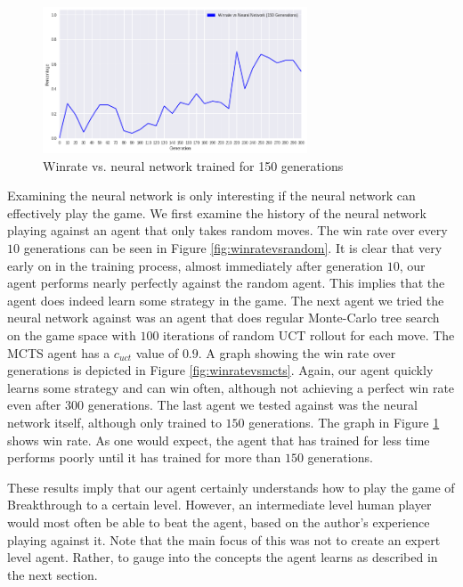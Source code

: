 \begin{figure}
    \begin{small}
        \begin{center}
            \includegraphics[width=0.7\textwidth]{graphics/winratevsneuralnetwork.png}
        \end{center}
        \caption{Winrate vs. neural network trained for 150 generations}
        \label{fig:winratevsneuralnetwork}
    \end{small}
\end{figure}

Examining the neural network is only interesting if the neural network can effectively play the game. We first examine the history of the neural network playing against an agent that only takes random moves. The win rate over every $10$ generations can be seen in Figure \ref{fig:winratevsrandom}. It is clear that very early on in the training process, almost immediately after generation $10$, our agent performs nearly perfectly against the random agent. This implies that the agent does indeed learn some strategy in the game. The next agent we tried the neural network against was an agent that does regular Monte-Carlo tree search on the game space with $100$ iterations of random UCT rollout for each move. The MCTS agent has a $c_{uct}$ value of $0.9$. A graph showing the win rate over generations is depicted in Figure \ref{fig:winratevsmcts}. Again, our agent quickly learns some strategy and can win often, although not achieving a perfect win rate even after $300$ generations. The last agent we tested against was the neural network itself, although only trained to $150$ generations. The graph in Figure \ref{fig:winratevsneuralnetwork} shows win rate. As one would expect, the agent that has trained for less time performs poorly until it has trained for more than $150$ generations.

These results imply that our agent certainly understands how to play the game of Breakthrough to a certain level. However, an intermediate level human player would most often be able to beat the agent, based on the author's experience playing against it. Note that the main focus of this was not to create an expert level agent. Rather, to gauge into the concepts the agent learns as described in the next section.

